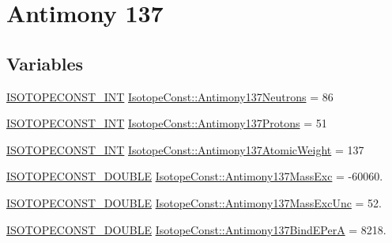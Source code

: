 \hypertarget{group___isotope_const-_antimony-_sb137}{}\section{Antimony 137}
\label{group___isotope_const-_antimony-_sb137}
\subsection*{Variables}
\begin{DoxyCompactItemize}
\item 
\mbox{\hyperlink{group___isotope_const-_macros_ga5f18360b3e99483a35c32d789e62621c}{I\+S\+O\+T\+O\+P\+E\+C\+O\+N\+S\+T\+\_\+\+I\+NT}} \mbox{\hyperlink{group___isotope_const-_antimony-_sb137_ga0d28bd85472e7e322d27701661dd475a}{Isotope\+Const\+::\+Antimony137\+Neutrons}} = 86
\item 
\mbox{\hyperlink{group___isotope_const-_macros_ga5f18360b3e99483a35c32d789e62621c}{I\+S\+O\+T\+O\+P\+E\+C\+O\+N\+S\+T\+\_\+\+I\+NT}} \mbox{\hyperlink{group___isotope_const-_antimony-_sb137_ga3c9de0082948638d7335bc848b44c174}{Isotope\+Const\+::\+Antimony137\+Protons}} = 51
\item 
\mbox{\hyperlink{group___isotope_const-_macros_ga5f18360b3e99483a35c32d789e62621c}{I\+S\+O\+T\+O\+P\+E\+C\+O\+N\+S\+T\+\_\+\+I\+NT}} \mbox{\hyperlink{group___isotope_const-_antimony-_sb137_gaaf461b3821d74d3d45ab9b8b91702e16}{Isotope\+Const\+::\+Antimony137\+Atomic\+Weight}} = 137
\item 
\mbox{\hyperlink{group___isotope_const-_macros_ga8f45a7272ce02c0b4c65c44636ed719a}{I\+S\+O\+T\+O\+P\+E\+C\+O\+N\+S\+T\+\_\+\+D\+O\+U\+B\+LE}} \mbox{\hyperlink{group___isotope_const-_antimony-_sb137_gab48a3896a6a2c34fbb851882091f931c}{Isotope\+Const\+::\+Antimony137\+Mass\+Exc}} = -\/60060.
\item 
\mbox{\hyperlink{group___isotope_const-_macros_ga8f45a7272ce02c0b4c65c44636ed719a}{I\+S\+O\+T\+O\+P\+E\+C\+O\+N\+S\+T\+\_\+\+D\+O\+U\+B\+LE}} \mbox{\hyperlink{group___isotope_const-_antimony-_sb137_gada87d71c0b0e5ce68e3724de7ed918d9}{Isotope\+Const\+::\+Antimony137\+Mass\+Exc\+Unc}} = 52.
\item 
\mbox{\hyperlink{group___isotope_const-_macros_ga8f45a7272ce02c0b4c65c44636ed719a}{I\+S\+O\+T\+O\+P\+E\+C\+O\+N\+S\+T\+\_\+\+D\+O\+U\+B\+LE}} \mbox{\hyperlink{group___isotope_const-_antimony-_sb137_gae179ca537bf44f5d5e1e81b6eead8126}{Isotope\+Const\+::\+Antimony137\+Bind\+E\+PerA}} = 8218.
\item 

\end{DoxyCompactItemize}
